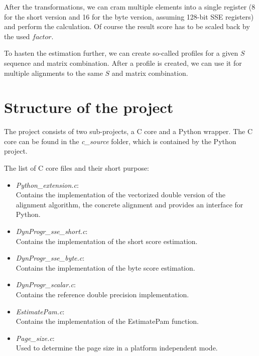 \documentclass[12pt]{article}
\begin{document}
After the transformations, we can cram multiple elements into a single register (8 for the short version and 16 for the byte version, assuming 128-bit SSE registers) and perform the calculation. Of course the result score has to be scaled back by the used $factor$.

To hasten the estimation further, we can create so-called profiles for a given $S$ sequence and matrix combination. After a profile is created, we can use it for multiple alignments to the same $S$ and matrix combination.

\section{Structure of the project}
The project consists of two sub-projects, a C core and a Python wrapper. The C core can be found in the \emph{c\_source} folder, which is contained by the Python project.

The list of C core files and their short purpose:
\begin{itemize}
	\item \emph{Python\_extension.c}:\\
	Contains the implementation of the vectorized double version of the alignment algorithm, the concrete alignment and provides an interface for Python.
	\item \emph{DynProgr\_sse\_short.c}:\\
	Contains the implementation of the short score estimation.
	\item \emph{DynProgr\_sse\_byte.c}:\\
	Contains the implementation of the byte score estimation.
	\item \emph{DynProgr\_scalar.c}:\\
		Contains the reference double precision implementation.
	\item \emph{EstimatePam.c}:\\
		Contains the implementation of the EstimatePam function.
	\item \emph{Page\_size.c}:\\
	Used to determine the page size in a platform independent mode.
\end{itemize}
\end{document}
